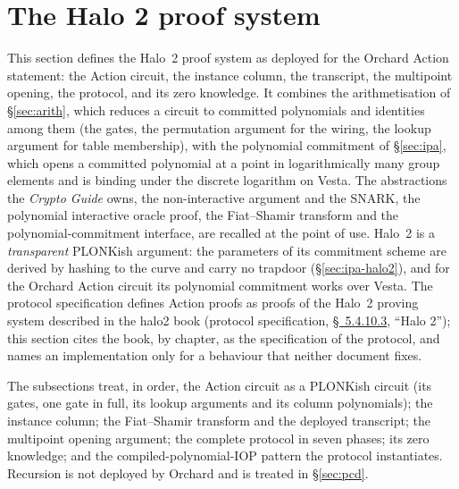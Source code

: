 \documentclass[11pt,a4paper]{article}
\theoremstyle{definition}
\begin{document}

\section{The Halo 2 proof system}
\label{sec:halo2}

This section defines the Halo~2 proof system as deployed for the Orchard
Action statement: the Action circuit, the instance column, the transcript,
the multipoint opening, the protocol, and its zero knowledge. It combines
the arithmetisation of \S\ref{sec:arith}, which reduces a circuit to
committed polynomials and identities among them (the gates, the
permutation argument for the wiring, the lookup argument for table
membership), with the polynomial commitment of \S\ref{sec:ipa}, which
opens a committed polynomial at a point in logarithmically many group
elements and is binding under the discrete logarithm on Vesta. The
abstractions the \emph{Crypto Guide} owns, the non-interactive argument
and the SNARK, the polynomial interactive oracle proof, the Fiat--Shamir
transform and the polynomial-commitment interface, are recalled at the
point of use. Halo~2 is a \emph{transparent} PLONKish argument: the
parameters of its commitment scheme are derived by hashing to the curve
and carry no trapdoor (\S\ref{sec:ipa-halo2}), and for the Orchard Action
circuit its polynomial commitment works over Vesta. The protocol
specification defines Action proofs as proofs of the Halo~2 proving
system described in the halo2 book (protocol specification,
\href{https://zips.z.cash/protocol/protocol.pdf\#halo2}{\S~5.4.10.3},
``Halo 2''); this section cites the book, by chapter, as the
specification of the protocol, and names an implementation only for a
behaviour that neither document fixes.

The subsections treat, in order, the Action circuit as a PLONKish circuit
(its gates, one gate in full, its lookup arguments and its column
polynomials); the instance column; the Fiat--Shamir transform and the
deployed transcript; the multipoint opening argument; the complete
protocol in seven phases; its zero knowledge; and the
compiled-polynomial-IOP pattern the protocol instantiates. Recursion is
not deployed by Orchard and is treated in \S\ref{sec:pcd}.
\end{document}
